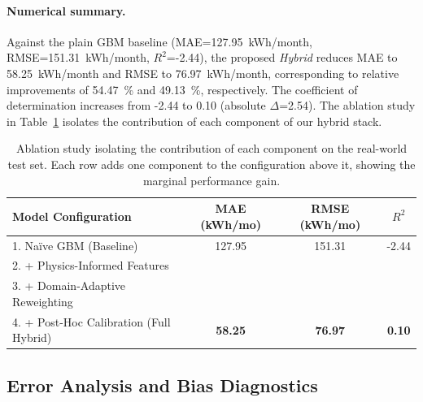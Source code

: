 ﻿\documentclass{article}
\begin{document}
\paragraph{Numerical summary.} Against the plain GBM baseline (MAE=127.95~kWh/month, RMSE=151.31~kWh/month, $R^2$=-2.44), the proposed \emph{Hybrid} reduces MAE to 58.25~kWh/month and RMSE to 76.97~kWh/month, corresponding to relative improvements of 54.47~\% and 49.13~\%, respectively.
The coefficient of determination increases from -2.44 to 0.10 (absolute $\Delta$=2.54).
The ablation study in Table~\ref{tab:ablation_study} isolates the contribution of each component of our hybrid stack.
\label{subsec:real_results}
\begin{table}[t]
  \centering
  \caption{Main-task performance on real projects (LOPO across buildings).
Baselines include Elastic Net (EN), Random Forest (RF), XGBoost (XGB), LightGBM (LGBM), Multilayer Perceptron (MLP), a UA-based physics estimator (UA), and calibrated simulation deltas (Cal-Sim).
Hybrid is our proposed stack. Metrics: MAE and RMSE measured in kWh/month per building, coefficient of determination ($R^2$), CV(RMSE), and NMBE.}
  \label{tab:real_results}
  
\end{table}

\begin{table}[h!]
  \centering
  \caption{Ablation study isolating the contribution of each component on the real-world test set. Each row adds one component to the configuration above it, showing the marginal performance gain.}
  \label{tab:ablation_study}
  \begin{tabular}{@{}lccc@{}}
    \toprule
    \textbf{Model Configuration} & \textbf{MAE} (kWh/mo) & \textbf{RMSE} (kWh/mo) & \textbf{$R^2$} \\
    \midrule
    1. Naïve GBM (Baseline) & 127.95 & 151.31 & -2.44 \\
    2. + Physics-Informed Features & \textit{} & \textit{} & \textit{} \\
    3. + Domain-Adaptive Reweighting & \textit{} & \textit{} & \textit{} \\
    4. + Post-Hoc Calibration (Full Hybrid) & \textbf{58.25} & \textbf{76.97} & \textbf{0.10} \\
    \bottomrule
  \end{tabular}
\end{table}

\subsection{Error Analysis and Bias Diagnostics}
\label{subsec:error_analysis}
\end{document}
